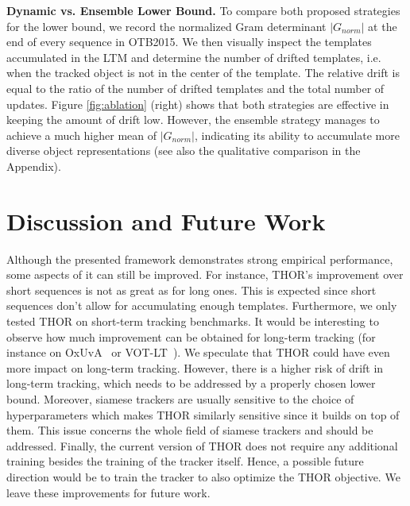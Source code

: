 \documentclass{article}
\begin{document}
\textbf{Dynamic vs. Ensemble Lower Bound.}
To compare both proposed strategies for the lower bound, we record the normalized Gram determinant $|G_{norm}|$ at the end of every sequence in OTB2015. We then visually inspect the templates accumulated in the LTM and determine the number of drifted templates, i.e. when the tracked object is not in the center of the template. The relative drift is equal to the ratio of the number of drifted templates and the total number of updates. Figure \ref{fig:ablation} (right) shows that both strategies are effective in keeping the amount of drift low. However, the ensemble strategy manages to achieve a much higher mean of $|G_{norm}|$, indicating its ability to accumulate more diverse object representations (see also the qualitative comparison in the Appendix).

\section{Discussion and Future Work}
Although the presented framework demonstrates strong empirical performance, some aspects of it can still be improved. For instance, THOR's improvement over short sequences is not as great as for long ones.  This is expected since short sequences don't allow for accumulating enough templates. 
Furthermore, we only tested THOR on short-term tracking benchmarks. It would be interesting to observe how much improvement can be obtained for long-term tracking (for instance on OxUvA~\cite{valmadre2018long} or VOT-LT~\cite{VOT_TPAMI}). We speculate that THOR could have even more impact on long-term tracking. However, there is a higher risk of drift in long-term tracking, which needs to be addressed by a properly chosen lower bound. 
Moreover, siamese trackers are usually sensitive to the choice of hyperparameters which makes THOR similarly sensitive since it builds on top of them. This issue concerns the whole field of siamese trackers and should be addressed. 
Finally, the current version of THOR does not require any additional training besides the training of the tracker itself. Hence, a possible future direction would be to train the tracker to also optimize the THOR objective. We leave these improvements for future work.
\end{document}
